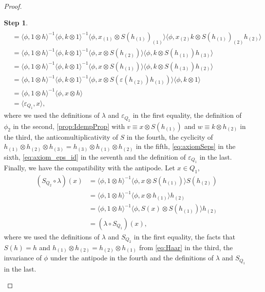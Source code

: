 \documentclass[a4paper,10pt]{amsart}
\newcommand{\eval}[2]{\langle #1 , #2\rangle}
\theoremstyle{definition}
\newtheorem{step-goursat}{Step}
\begin{document}
\begin{proof}
\begin{step-goursat}
\begin{align*}
        \\
        &=
        \eval{\phi}{1\otimes h}^{-1}
            \eval{\phi}{k\otimes 1}^{-1}
                \eval{\phi}{x_{(1)} \otimes S(h_{(1)})_{(1)}}
                    \eval{\phi}{x_{(2)}k\otimes S(h_{(1)})_{(2)}h_{(2)}}
        \\
        &=
        \eval{\phi}{1\otimes h}^{-1}
            \eval{\phi}{k\otimes 1}^{-1}
                \eval{\phi}{x \otimes S(h_{(2)})}
                    \eval{\phi}{k\otimes S(h_{(1)})h_{(3)}}
        \\
        &=
        \eval{\phi}{1\otimes h}^{-1}
            \eval{\phi}{k\otimes 1}^{-1}
                \eval{\phi}{x \otimes S(h_{(1)})}
                    \eval{\phi}{k\otimes S(h_{(3)})h_{(2)}}
        \\
        &=
        \eval{\phi}{1\otimes h}^{-1}
            \eval{\phi}{k\otimes 1}^{-1}
                \eval{\phi}{x \otimes S(\varepsilon(h_{(2)})h_{(1)})}
                    \eval{\phi}{k\otimes 1}
        \\
        &=
        \eval{\phi}{1\otimes h}^{-1}
            \eval{\phi}{x \otimes h}
        \\
        &=
        \eval{\varepsilon_{Q_1}}{x},
    \end{align*}
    where we used the definitions of $\lambda$ and $\varepsilon_{Q_2}$ in the first equality, the definition of $\phi_2$ in the second, \cref{prop:IdempProp} with $v\equiv x \otimes S(h_{(1)})$ and $w\equiv k\otimes h_{(2)}$ in the third, the anticomultiplicativity of $S$ in the fourth, the cyclicity of $h_{(1)} \otimes h_{(2)} \otimes h_{(3)}=h_{(3)} \otimes h_{(1)} \otimes h_{(2)}$ in the fifth, \cref{eq:axiomSeps} in the sixth, \cref{eq:axiom_eps_id} in the seventh and the definition of $\varepsilon_{Q_1}$ in the last.
    \smallbreak\noindent%
    Finally, we have the compatibility with the antipode. Let $x\in Q_1$,
    \begin{align*}
        (S_{Q_2} \circ \lambda)(x)
        &=
            \eval{\phi}{1\otimes h}^{-1}
                \eval{\phi}{x \otimes S(h_{(1)})}
                    S(h_{(2)})
        \\
        &=
            \eval{\phi}{1\otimes h}^{-1}
                \eval{\phi}{x \otimes h_{(1)}}
                    h_{(2)}
        \\
        &=
            \eval{\phi}{1\otimes h}^{-1}
                \eval{\phi}{S(x) \otimes S(h_{(1)})}
                    h_{(2)}
        \\
        &=
        (\lambda \circ S_{Q_1})(x),
    \end{align*}
    where we used the definitions of $\lambda$ and $S_{Q_2}$ in the first equality, the facts that $S(h)=h$ and $h_{(1)} \otimes h_{(2)}=h_{(2)} \otimes h_{(1)}$ from \cref{eq:Haar} in the third, the invariance of $\phi$ under the antipode in the fourth and the definitions of $\lambda$ and $S_{Q_1}$ in the last.
    \end{step-goursat}


\end{proof}
\end{document}
